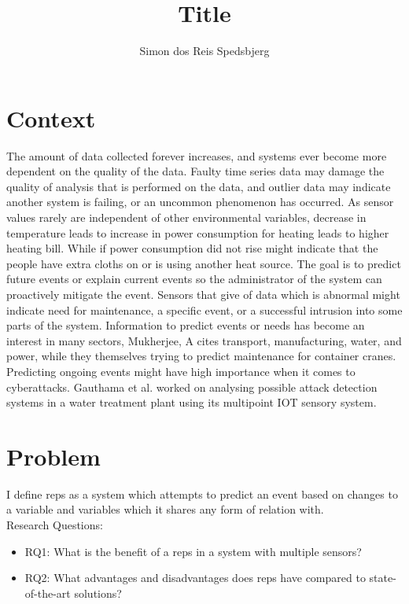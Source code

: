 \documentclass[a4paper,8pt]{article}
\title{Title}
\author{Simon dos Reis Spedsbjerg}
\begin{document}
	\maketitle
	\section{Context}
		The amount of data collected forever increases, and systems ever become more dependent on the quality of the data. Faulty time series data may damage the quality of analysis that is performed on the data, and outlier data may indicate another system is failing, or an uncommon phenomenon has occurred. As sensor values rarely are independent of other environmental variables, decrease in temperature leads to increase in power consumption for heating leads to higher heating bill. While if power consumption did not rise might indicate that the people have extra cloths on or is using another heat source. The goal is to predict future events or explain current events so the administrator of the system can proactively mitigate the event. Sensors that give of data which is abnormal might indicate need for maintenance\cite{MUKHERJEE2024102444}, a specific event, or a successful intrusion into some parts of the system\cite{MR2022103046}. Information to predict events or needs has become an interest in many sectors, Mukherjee, A\cite{MUKHERJEE2024102444} cites transport, manufacturing, water, and power, while they themselves trying to predict maintenance for container cranes. Predicting ongoing events might have high importance when it comes to cyberattacks. Gauthama et al. worked on analysing possible attack detection systems in a water treatment plant using its multipoint IOT sensory system\cite{MR2022103046}.
			
	\section{Problem}
		I define \gls{reps} as a system which attempts to predict an event based on changes to a variable and variables which it shares any form of relation with.\\
		Research Questions:
		\begin{itemize}
			\item RQ1: What is the benefit of a \gls{reps} in a system with multiple sensors?
			\item RQ2: What advantages and disadvantages does \gls{reps} have compared to state-of-the-art solutions?
		\end{itemize}
	\newpage
\end{document}
